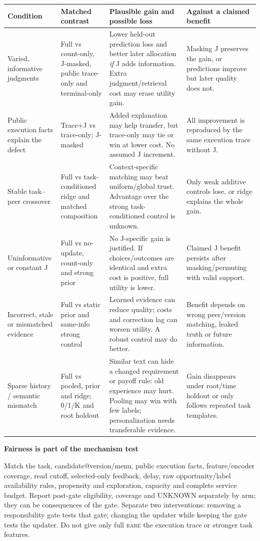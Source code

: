 \documentclass[10pt,a4paper]{article}
\newcommand{\lead}[1]{\vspace{4pt}\textbf{#1}\par}
\newcommand{\rare}{\textsc{rare}}
\begin{document}
\begin{center}\small
\begin{tabularx}{\linewidth}{@{}L{.20\linewidth}L{.22\linewidth}X L{.23\linewidth}@{}}\toprule
Condition & Matched contrast & Plausible gain and possible loss & Against a claimed benefit\\\midrule
Varied, informative judgments & Full vs count-only, J-masked, public trace-only and terminal-only & Lower held-out prediction loss and better later allocation \emph{if} J adds information. Extra judgment/retrieval cost may erase utility gain. & Masking J preserves the gain, or predictions improve but later quality does not.\\
Public execution facts explain the defect & Trace+J vs trace-only; J-masked & Added explanation may help transfer, but trace-only may tie or win at lower cost. No assumed J increment. & All improvement is reproduced by the same execution trace without J.\\
Stable task--peer crossover & Full vs task-conditioned ridge and matched composition & Context-specific matching may beat uniform/global trust. Advantage over the strong task-conditioned control is unknown. & Only weak additive controls lose, or ridge explains the whole gain.\\
Uninformative or constant J & Full vs no-update, count-only and strong prior & No J-specific gain is justified. If choices/outcomes are identical and extra cost is positive, full utility is lower. & Claimed J benefit persists after masking/permuting with valid support.\\
Incorrect, stale or mismatched evidence & Full vs static prior and same-info strong control & Learned evidence can reduce quality; costs and correction lag can worsen utility. A robust control may do better. & Benefit depends on wrong peer/version matching, leaked truth or future information.\\
Sparse history / semantic mismatch & Full vs pooled, prior and ridge; 0/1/K and root holdout & Similar text can hide a changed requirement or payoff rule: old experience may hurt. Pooling may win with few labels; personalization needs transferable evidence. & Gain disappears under root/time holdout or only follows repeated task templates.\\\bottomrule
\end{tabularx}\end{center}

\lead{Fairness is part of the mechanism test}
Match the task, candidate@version/menu, public execution facts, feature/encoder
coverage, read cutoff, selected-only feedback, delay, raw opportunity/label
availability rules, propensity and exploration, capacity and complete service
budget. Report post-gate eligibility, coverage and UNKNOWN separately by arm;
they can be consequences of the gate. Separate
two interventions: removing a responsibility gate tests that gate; changing the
updater while keeping the gate tests the updater. Do not give only full \rare{}
the execution trace or stronger task features.
\end{document}
